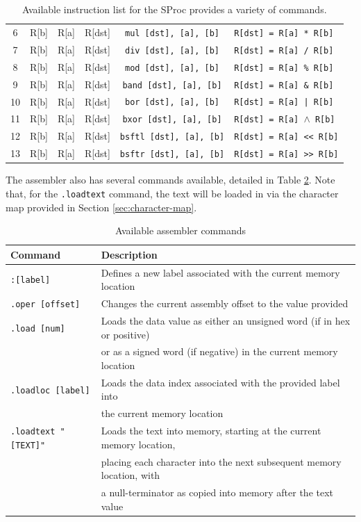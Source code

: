 \documentclass{article}
\begin{document}
\begin{table}[h!]
\begin{footnotesize}
\begin{tabular}{cccc|c|l}
			6 & R[b] & R[a] & R[dst] & \texttt{mul [dst], [a], [b]} & \texttt{R[dst] = R[a] * R[b]} \\
			7 & R[b] & R[a] & R[dst] & \texttt{div [dst], [a], [b]} & \texttt{R[dst] = R[a] / R[b]} \\
			8 & R[b] & R[a] & R[dst] & \texttt{mod [dst], [a], [b]} & \texttt{R[dst] = R[a] \% R[b]} \\
			9 & R[b] & R[a] & R[dst] & \texttt{band [dst], [a], [b]} & \texttt{R[dst] = R[a] \& R[b]} \\
			10 & R[b] & R[a] & R[dst] & \texttt{bor [dst], [a], [b]} & \texttt{R[dst] = R[a] | R[b]} \\
			11 & R[b] & R[a] & R[dst] & \texttt{bxor [dst], [a], [b]} & \texttt{R[dst] = R[a] $\wedge$ R[b]} \\
			12 & R[b] & R[a] & R[dst] & \texttt{bsftl [dst], [a], [b]} & \texttt{R[dst] = R[a] << R[b]} \\
			13 & R[b] & R[a] & R[dst] & \texttt{bsftr [dst], [a], [b]} & \texttt{R[dst] = R[a] >> R[b]} \\
			\hline
		\end{tabular}
	\end{footnotesize}
	\caption{Available instruction list for the SProc provides a variety of commands.}
	\label{table:instruction-table}
\end{table}

\pagebreak

The assembler also has several commands available, detailed in Table \ref{table:assembler-commands}. Note that, for the \texttt{.loadtext} command, the text will be loaded in via the character map provided in Section \ref{sec:character-map}.

\begin{table}[h!]
	\centering
	\begin{tabular}{l|l}
		\hline
		Command & Description \\
		\hline
		\texttt{:[label]} & Defines a new label associated with the current memory location \\
		\texttt{.oper [offset]} & Changes the current assembly offset to the value provided \\
		\texttt{.load [num]} & Loads the data value as either an unsigned word (if in hex or positive)\\
		& or as a signed word (if negative) in the current memory location \\
		\texttt{.loadloc [label]} & Loads the data index associated with the provided label into \\
		& the current memory location \\
		\texttt{.loadtext "[TEXT]"} & Loads the text into memory, starting at the current memory location, \\
		& placing each character into the next subsequent memory location, with \\
		& a null-terminator as copied into memory after the text value \\
		\hline
	\end{tabular}
	\caption{Available assembler commands}
	\label{table:assembler-commands}
\end{table}
\end{document}
